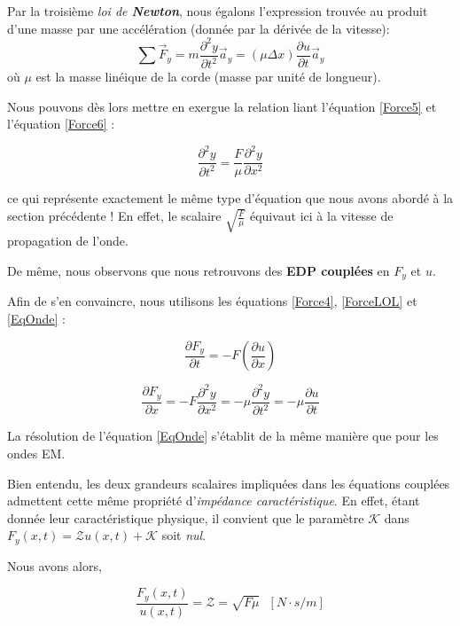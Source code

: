 Par la troisième \textit{loi de \textbf{Newton}}, nous égalons l'expression trouvée au produit d'une masse par une accélération (donnée par la dérivée de la vitesse):
\begin{equation}
\sum \vec{F}_{y}  = m \frac{\partial^{2} y }{\partial t^{2}} \vec{a}_{y} =  (\mu \Delta x) \frac{\partial u }{\partial t} \vec{a}_{y}  
\label{Force6}
\end{equation}
où $\mu$ est la masse linéique de la corde (masse par unité de longueur).

Nous pouvons dès lors mettre en exergue la relation liant l'équation \eqref{Force5} et l'équation \eqref{Force6} : 

\begin{equation}
\frac{\partial^{2} y }{\partial t^{2}} = \frac{F}{\mu}  \frac{\partial^{2} y }{\partial x^{2}}
\label{EqOnde}
\end{equation}

ce qui représente exactement le même type d'équation que nous avons abordé à la section précédente ! 
En effet, le scalaire $\sqrt{\frac{F}{\mu}}$ équivaut ici à la vitesse de propagation de l'onde.

De même, nous observons que nous retrouvons des \textbf{EDP couplées} en $F_{y}$ et $u$.

Afin de s'en convaincre, nous utilisons les équations \eqref{Force4}, \eqref{ForceLOL} et \eqref{EqOnde} :

\[ \frac{\partial F_{y}}{\partial t} = - F (\frac{\partial u}{\partial x})\]

\[ \frac{\partial F_{y}}{\partial x} = -F \frac{\partial^{2} y}{\partial x^{2}} = -\mu \frac{\partial^{2} y}{\partial t^{2}} = -\mu \frac{\partial u}{\partial t} \]

La résolution de l'équation \eqref{EqOnde} s'établit de la même manière que pour les ondes EM.
 
Bien entendu, les deux grandeurs scalaires impliquées dans les équations couplées admettent cette même propriété
d'\textit{impédance caractéristique}. En effet, étant donnée leur caractéristique physique, il convient que le paramètre $\mathcal{K}$ 
dans $F_{y}(x,t) = \mathcal{Z}u(x,t) + \mathcal{K}$ soit \textit{nul}.

Nous avons alors, 

\[\frac{F_{y}(x,t)}{u(x,t)} = \mathcal{Z} = \sqrt{F\mu} \hspace{8pt} [N\cdot s / m]\]

